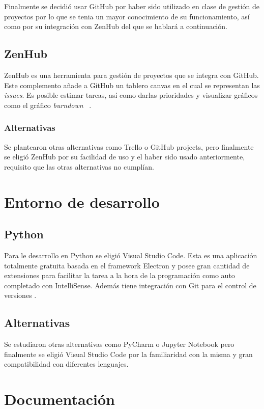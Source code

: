 Finalmente se decidió usar GitHub por haber sido utilizado en clase de gestión de proyectos por lo que se tenia un mayor conocimiento de su funcionamiento, así como por su integración con ZenHub del que se hablará a continuación.

\subsection{ZenHub}\label{ZenHub}
ZenHub es una herramienta para gestión de proyectos que se integra con GitHub. Este complemento añade a GitHub un tablero canvas en el cual se representan las \emph{issues}. Es posible estimar tareas, así como darlas prioridades y visualizar gráficos como el gráfico \emph{burndown}~ \cite{zenhub}.

\subsubsection{Alternativas}\label{AlternativasZotero}
Se plantearon otras alternativas como Trello o GitHub projects, pero finalmente se eligió  ZenHub por su facilidad de uso y el haber sido usado anteriormente, requisito que las otras alternativas no cumplían.

\section{Entorno de desarrollo}\label{IDE}
	\subsection{Python}\label{Python}
Para le desarrollo en Python se eligió Visual Studio Code. Esta es una aplicación totalmente gratuita basada en el framework Electron y posee gran cantidad de extensiones para facilitar la tarea a la hora de la programación como auto completado con IntelliSense. Además tiene integración con Git para el control de versiones \cite{wiki:vscode_wiki,vscode}.

\subsection{Alternativas}\label{AlternativasIDE}
Se estudiaron otras alternativas como PyCharm o Jupyter Notebook pero finalmente se eligió Visual Studio Code por la familiaridad con la misma y gran compatibilidad con diferentes lenguajes.

\section{Documentación}\label{Documentación}
